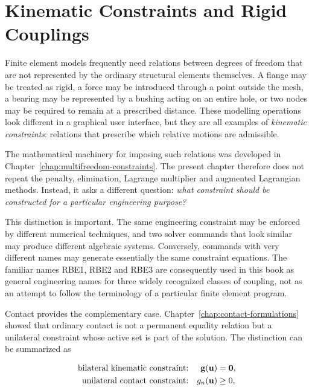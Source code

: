 \newpage
\chapter{Kinematic Constraints and Rigid Couplings}\label{chap:kinematic-constraints}

Finite element models frequently need relations between degrees of freedom that
are not represented by the ordinary structural elements themselves. A flange may
be treated as rigid, a force may be introduced through a point outside the mesh,
a bearing may be represented by a bushing acting on an entire hole, or two nodes
may be required to remain at a prescribed distance. These modelling operations
look different in a graphical user interface, but they are all examples of
\textit{kinematic constraints}: relations that prescribe which relative motions
are admissible.

The mathematical machinery for imposing such relations was developed in
Chapter~\ref{chap:multifreedom-constraints}. The present chapter therefore does
not repeat the penalty, elimination, Lagrange multiplier and augmented Lagrangian
methods. Instead, it asks a different question: \textit{what constraint should be
constructed for a particular engineering purpose?}

This distinction is important. The same engineering constraint may be enforced
by different numerical techniques, and two solver commands that look similar may
produce different algebraic systems. Conversely, commands with very different
names may generate essentially the same constraint equations. The familiar names
RBE1, RBE2 and RBE3 are consequently used in this book as general engineering
names for three widely recognized classes of coupling, not as an attempt to
follow the terminology of a particular finite element program.

Contact provides the complementary case. Chapter~\ref{chap:contact-formulations}
showed that ordinary contact is not a permanent equality relation but a unilateral
constraint whose active set is part of the solution. The distinction can be
summarized as

\begin{equation}
    \begin{aligned}
        \text{bilateral kinematic constraint:} && \mathbf{g}(\mathbf{u}) &= \mathbf{0}, \\
        \text{unilateral contact constraint:} && g_n(\mathbf{u}) &\geq 0,
    \end{aligned}
\end{equation}

